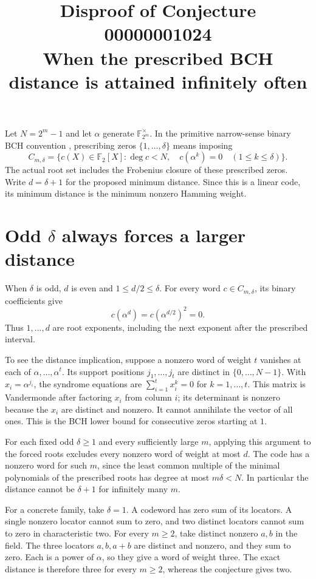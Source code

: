 \documentclass[11pt]{article}
\title{Disproof of Conjecture 00000001024\\
\large When the prescribed BCH distance is attained infinitely often}
\author{}
\date{}
\begin{document}
\maketitle

Let \(N=2^m-1\) and let \(\alpha\) generate
\(\mathbb F_{2^m}^{\times}\). In the primitive narrow-sense binary
BCH convention \cite{brc}, prescribing zeros
\(\{1,\ldots,\delta\}\) means imposing
\[
  C_{m,\delta}
  =\{c(X)\in\mathbb F_2[X]:\deg c<N,\quad
                       c(\alpha^k)=0\quad(1\le k\le\delta)\}.
\]
The actual root set includes the Frobenius closure of these prescribed
zeros. Write \(d=\delta+1\) for the proposed minimum distance. Since
this is a linear code, its minimum distance is the minimum nonzero
Hamming weight.

\section*{Odd \(\delta\) always forces a larger distance}

When \(\delta\) is odd, \(d\) is even and \(1\le d/2\le\delta\).
For every word \(c\in C_{m,\delta}\), its binary coefficients give
\[
  c(\alpha^d)=c(\alpha^{d/2})^2=0.
\]
Thus \(1,\ldots,d\) are root exponents, including the next exponent
after the prescribed interval.

To see the distance implication, suppose a nonzero word of weight
\(t\) vanishes at each of \(\alpha,\ldots,\alpha^t\). Its support
positions \(j_1,\ldots,j_t\) are distinct in \(\{0,\ldots,N-1\}\).
With \(x_i=\alpha^{j_i}\), the syndrome equations are
\(\sum_{i=1}^t x_i^k=0\) for \(k=1,\ldots,t\). This matrix is
Vandermonde after factoring \(x_i\) from column \(i\); its determinant
is nonzero because the \(x_i\) are distinct and nonzero. It cannot
annihilate the vector of all ones. This is the BCH lower bound for
consecutive zeros starting at \(1\).

For each fixed odd \(\delta\ge1\) and every sufficiently large \(m\),
applying this argument to the forced roots excludes every nonzero
word of weight at most \(d\). The code has a nonzero word for such
\(m\), since the least common multiple of the minimal polynomials
of the prescribed roots has degree at most \(m\delta<N\).
In particular the distance cannot be
\(\delta+1\) for infinitely many \(m\).

For a concrete family, take \(\delta=1\). A codeword has zero sum of
its locators. A single nonzero locator cannot sum to zero, and two
distinct locators cannot sum to zero in characteristic two. For
every \(m\ge2\), take distinct nonzero \(a,b\) in the field. The
three locators \(a,b,a+b\) are distinct and nonzero, and they sum
to zero. Each is a power of \(\alpha\), so they give a word of
weight three. The exact distance is therefore three for every
\(m\ge2\), whereas the conjecture gives two.
\end{document}
